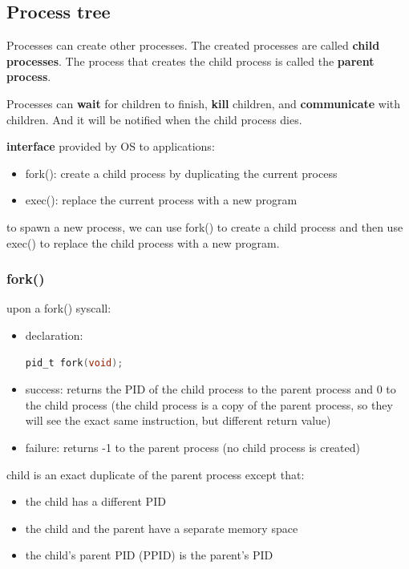 \documentclass[letterpaper,12pt]{article}
\begin{document}
\subsection{Process tree}
Processes can create other processes. The created processes are called
\textbf{child processes}. The process that creates the child process is called
the \textbf{parent process}.

Processes can \textbf{wait} for children to finish, \textbf{kill} children, and
\textbf{communicate} with children. And it will be notified when the child
process dies.

\textbf{interface} provided by OS to applications: \begin{itemize}
    \item fork(): create a child process by duplicating the current process
    \item exec(): replace the current process with a new program
\end{itemize}
to spawn a new process, we can use fork() to create a child process and then use exec() to replace the child process with a new program.

\subsubsection{fork()}
upon a fork() syscall:\begin{itemize}
    \item declaration: \begin{lstlisting}[language=C]
        pid_t fork(void);
    \end{lstlisting}
    \item success: returns the PID of the child process to the parent process and 0 to
          the child process (the child process is a copy of the parent process, so they
          will see the exact same instruction, but different return value)
    \item failure: returns -1 to the parent process (no child process is created)
\end{itemize}

child is an exact duplicate of the parent process except that:\begin{itemize}
    \item the child has a different PID
    \item the child and the parent have a separate memory space
    \item the child's parent PID (PPID) is the parent's PID
\end{itemize}
\end{document}
